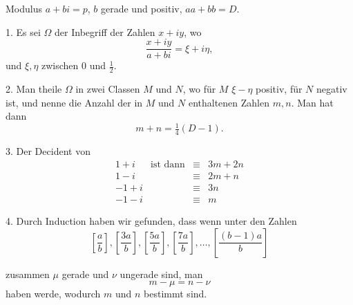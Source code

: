 \NoSourceHead
{}
\par\indent Modulus $a+bi=p$, $b$ gerade und positiv, $aa+bb=D$.

1. Es sei $\Omega$ der Inbegriff der Zahlen $x+iy$, wo
\[
\frac{x+iy}{a+bi}=\xi+i\eta,
\]
\noindent und $\xi,\eta$ zwischen $0$ und $\tfrac12$.

2. Man theile $\Omega$ in zwei Classen $M$ und $N$, wo für $M$ $\xi-\eta$ positiv, für $N$ negativ ist, und nenne die Anzahl der in $M$ und $N$ enthaltenen Zahlen $m,n$. Man hat dann
\[
m+n=\tfrac14(D-1).
\]
\par\noindent\hspace*{\parindent}3. Der Decident von
\[
\begin{array}{rccl}
1+i&\text{ist dann}&\equiv&3m+2n\\
1-i&&\equiv&2m+n\\
-1+i&&\equiv&3n\\
-1-i&&\equiv&m
\end{array}
\]
\par\noindent\hspace*{\parindent}4. Durch Induction haben wir gefunden, dass wenn unter den Zahlen
\[
\left[\frac ab\right],\left[\frac{3a}b\right],\left[\frac{5a}b\right],\left[\frac{7a}b\right],\ldots,\left[\frac{(b-1)a}b\right]
\]
\clearpage

\noindent zusammen $\mu$ gerade und $\nu$ ungerade sind, man
\[
m-\mu=n-\nu
\]
\noindent haben werde, wodurch $m$ und $n$ bestimmt sind.

